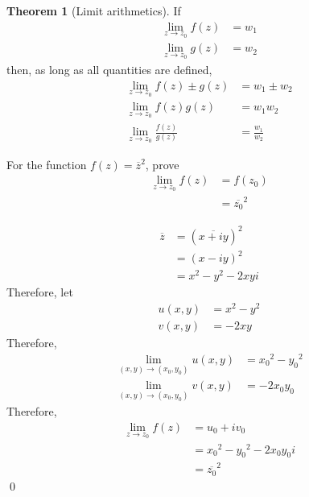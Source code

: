 \documentclass[titlepage, fleqn, a4paper, 12pt, twoside]{article}
\theoremstyle{definition}
\theoremstyle{theorem}
\newtheorem{theorem}{Theorem}
\begin{document}
\begin{theorem}[Limit arithmetics]
	If
	\begin{align*}
		\lim\limits_{z \to z_0} f(z) & = w_1 \\
		\lim\limits_{z \to z_0} g(z) & = w_2
	\end{align*}
	then, as long as all quantities are defined,
	\begin{align*}
		\lim\limits_{z \to z_0} f(z) \pm g(z)     & = w_1 \pm w_2 \\
		\lim\limits_{z \to z_0} f(z) g(z)         & = w_1 w_2     \\
		\lim\limits_{z \to z_0} \frac{f(z)}{g(z)} & = \frac{w_1}{w_2}
	\end{align*}
\end{theorem}

\begin{question}
	For the function $f(z) = \overline{z}^2$, prove
	\begin{align*}
		\lim\limits_{z \to z_0} f(z) & = f(z_0) \\
                                             & = \overline{z_0}^2
	\end{align*}
\end{question}

\begin{solution}
	\begin{align*}
		\overline{z} & = \left( \overline{x + i y} \right)^2 \\
                             & = (x - i y)^2                         \\
                             & = x^2 - y^2 - 2 x y i
	\end{align*}
	Therefore, let
	\begin{align*}
		u(x,y) & = x^2 - y^2 \\
		v(x,y) & = -2 x y
	\end{align*}
	Therefore,
	\begin{align*}
		\lim\limits_{(x,y) \to (x_0,y_0)} u(x,y) & = {x_0}^2 - {y_0}^2 \\
		\lim\limits_{(x,y) \to (x_0,y_0)} v(x,y) & = -2 x_0 y_0
	\end{align*}
	Therefore,
	\begin{align*}
		\lim\limits_{z \to z_0} f(z) & = u_0 + i v_0                     \\
                                             & = {x_0}^2 - {y_0}^2 - 2 x_0 y_0 i \\
                                             & = \overline{z_0}^2
	\end{align*}
	\qed
\end{solution}
\end{document}
